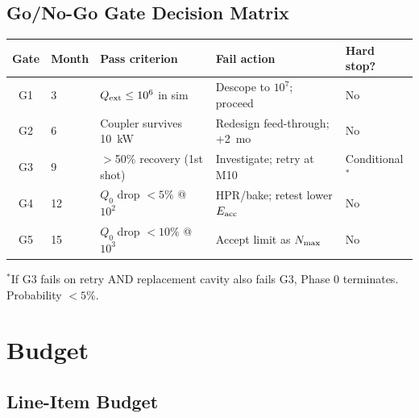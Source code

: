 \documentclass[11pt]{article}
\newcommand{\Qext}{Q_{\rm ext}}
\newcommand{\Qzero}{Q_0}
\begin{document}
\subsection{Go/No-Go Gate Decision Matrix}

\begin{center}
\small
\begin{tabular}{cllll}
\toprule
Gate & Month & Pass criterion & Fail action & Hard stop? \\
\midrule
G1 & 3 & $\Qext \leq 10^6$ in sim & Descope to $10^7$; proceed & No \\
G2 & 6 & Coupler survives 10~kW & Redesign feed-through; +2~mo & No \\
G3 & 9 & $>$50\% recovery (1st shot) & Investigate; retry at M10 & Conditional$^*$ \\
G4 & 12 & $\Qzero$ drop $<5\%$ @ $10^2$ & HPR/bake; retest lower $E_{\rm acc}$ & No \\
G5 & 15 & $\Qzero$ drop $<10\%$ @ $10^3$ & Accept limit as $N_{\rm max}$ & No \\
\bottomrule
\end{tabular}
\end{center}
$^*$If G3 fails on retry AND replacement cavity also fails G3,
Phase 0 terminates. Probability $< 5\%$.

\section{Budget}
\label{sec:budget}

\subsection{Line-Item Budget}
\end{document}
